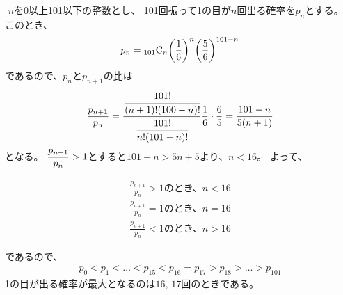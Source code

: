 \documentclass[a4paper]{ltjsarticle}
\begin{document}
\clearpage
{}
\begin{ans*}
  ${}$
  $n$を0以上101以下の整数とし、
  101回振って1の目が$n$回出る確率を$p_{n}$とする。
  このとき、
  \begin{gather*}
    p_{n} = {}_{101}\rm{C}_{n} \biggl(\frac{1}{6}\biggr)^{n}\biggl(\frac{5}{6}\biggr)^{101-n}
  \end{gather*}
  であるので、$p_{n}$と$p_{n+1}$の比は
  \begin{gather*}
    \frac{p_{n+1}}{p_{n}}
    = \frac{\cfrac{101!}{(n+1)! (100-n)!}}{\cfrac{101!}{n!(101-n)!}} \frac{1}{6} \cdot \frac{6}{5}
    = \frac{101-n}{5(n+1)}
  \end{gather*}
  となる。
  $\disp\frac{p_{n+1}}{p_{n}} > 1$とすると$101 - n > 5n + 5$より、$n < 16$。
  よって、
  \begin{fleqn}[20pt]
    \begin{align*}
      \frac{p_{n+1}}{p_{n}} > 1 \text{のとき、$n < 16$}\\
      \frac{p_{n+1}}{p_{n}} = 1 \text{のとき、$n = 16$}\\
      \frac{p_{n+1}}{p_{n}} < 1 \text{のとき、$n > 16$}
    \end{align*}
  \end{fleqn}
  であるので、
  \begin{gather*}
    p_{0} < p_{1} < \dots < p_{15} < p_{16} = p_{17} > p_{18} > \dots > p_{101}
  \end{gather*}
  1の目が出る確率が最大となるのは$16,\,17$回のときである。
\end{ans*}

\clearpage
{}
\end{document}
